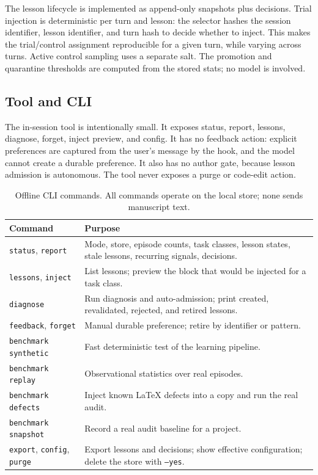 The lesson lifecycle is implemented as append-only snapshots plus decisions. Trial injection is deterministic per turn and lesson: the selector hashes the session identifier, lesson identifier, and turn hash to decide whether to inject. This makes the trial/control assignment reproducible for a given turn, while varying across turns. Active control sampling uses a separate salt. The promotion and quarantine thresholds are computed from the stored stats; no model is involved.

\subsection{Tool and CLI}
\label{sec:tool-cli}
The in-session tool is intentionally small. It exposes status, report, lessons, diagnose, forget, inject preview, and config. It has no feedback action: explicit preferences are captured from the user's message by the hook, and the model cannot create a durable preference. It also has no author gate, because lesson admission is autonomous. The tool never exposes a purge or code-edit action.

\begin{table}[t]
\centering
\small
\caption{Offline CLI commands. All commands operate on the local store; none sends manuscript text.}
\label{tab:cli}
\begin{tabularx}{\linewidth}{@{}l>{\raggedright\arraybackslash}X@{}}
\toprule
Command & Purpose \\
\midrule
\texttt{status}, \texttt{report} & Mode, store, episode counts, task classes, lesson states, stale lessons, recurring signals, decisions. \\
\texttt{lessons}, \texttt{inject} & List lessons; preview the block that would be injected for a task class. \\
\texttt{diagnose} & Run diagnosis and auto-admission; print created, revalidated, rejected, and retired lessons. \\
\texttt{feedback}, \texttt{forget} & Manual durable preference; retire by identifier or pattern. \\
\texttt{benchmark synthetic} & Fast deterministic test of the learning pipeline. \\
\texttt{benchmark replay} & Observational statistics over real episodes. \\
\texttt{benchmark defects} & Inject known \LaTeX{} defects into a copy and run the real audit. \\
\texttt{benchmark snapshot} & Record a real audit baseline for a project. \\
\texttt{export}, \texttt{config}, \texttt{purge} & Export lessons and decisions; show effective configuration; delete the store with \texttt{--yes}. \\
\bottomrule
\end{tabularx}
\end{table}

